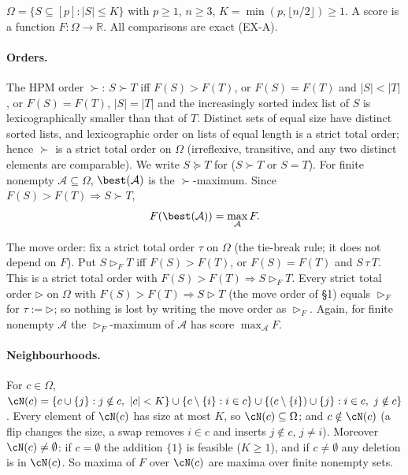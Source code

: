 \documentclass[11pt]{report}
\begin{document}
$\Omega=\{S\subseteq[p]:|S|\le K\}$ with $p\ge1$, $n\ge3$, $K=\min(p,\lfloor n/2\rfloor)\ge1$. A score is a function $F:\Omega\to\mathbb{R}$. All comparisons are exact (EX-A).

\paragraph{Orders.} The HPM order $\succ$: $S\succ T$ iff $F(S)>F(T)$, or $F(S)=F(T)$ and $|S|<|T|$, or $F(S)=F(T)$, $|S|=|T|$ and the increasingly sorted index list of $S$ is lexicographically smaller than that of $T$. Distinct sets of equal size have distinct sorted lists, and lexicographic order on lists of equal length is a strict total order; hence $\succ$ is a strict total order on $\Omega$ (irreflexive, transitive, and any two distinct elements are comparable). We write $S\succeq T$ for ($S\succ T$ or $S=T$). For finite nonempty $\mathcal A\subseteq\Omega$, $\best(\mathcal A)$ is the $\succ$-maximum. Since $F(S)>F(T)\Rightarrow S\succ T$,
\begin{equation}\label{T20:eq:bestmax}
F(\best(\mathcal A))=\max_{\mathcal A}F .
\end{equation}

The move order: fix a strict total order $\tau$ on $\Omega$ (the tie-break rule; it does not depend on $F$). Put $S\rhd_F T$ iff $F(S)>F(T)$, or $F(S)=F(T)$ and $S\,\tau\,T$. This is a strict total order with $F(S)>F(T)\Rightarrow S\rhd_F T$. Every strict total order $\rhd$ on $\Omega$ with $F(S)>F(T)\Rightarrow S\rhd T$ (the move order of \S1) equals $\rhd_F$ for $\tau:=\rhd$; so nothing is lost by writing the move order as $\rhd_F$. Again, for finite nonempty $\mathcal A$ the $\rhd_F$-maximum of $\mathcal A$ has score $\max_{\mathcal A}F$.

\paragraph{Neighbourhoods.} For $c\in\Omega$,
$\cN(c)=\{c\cup\{j\}:j\notin c,\ |c|<K\}\cup\{c\setminus\{i\}:i\in c\}\cup\{(c\setminus\{i\})\cup\{j\}:i\in c,\ j\notin c\}$.
Every element of $\cN(c)$ has size at most $K$, so $\cN(c)\subseteq\Omega$; and $c\notin\cN(c)$ (a flip changes the size, a swap removes $i\in c$ and inserts $j\notin c$, $j\ne i$). Moreover $\cN(c)\ne\emptyset$: if $c=\emptyset$ the addition $\{1\}$ is feasible ($K\ge1$), and if $c\ne\emptyset$ any deletion is in $\cN(c)$. So maxima of $F$ over $\cN(c)$ are maxima over finite nonempty sets.
\end{document}
